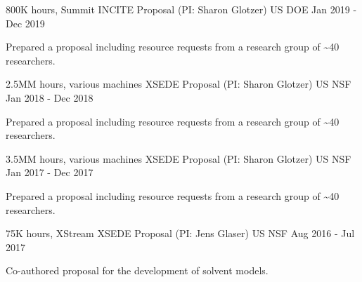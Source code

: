 \begin{cventries}
  \cventry
    {800K hours, Summit} %
    {INCITE Proposal (PI: Sharon Glotzer)} %
    {US DOE} %
    {Jan 2019 - Dec 2019} %
    {
        \begin{cvitems}
          \item Prepared a proposal including resource requests from a research group of \textasciitilde{}40 researchers.
        \end{cvitems}
    }
  \cventry
    {2.5MM hours, various machines} %
    {XSEDE Proposal (PI: Sharon Glotzer)} %
    {US NSF} %
    {Jan 2018 - Dec 2018} %
    {
        \begin{cvitems}
          \item Prepared a proposal including resource requests from a research group of \textasciitilde{}40 researchers.
        \end{cvitems}
    }
  \cventry
    {3.5MM hours, various machines} %
    {XSEDE Proposal (PI: Sharon Glotzer)} %
    {US NSF} %
    {Jan 2017 - Dec 2017} %
    {
        \begin{cvitems}
          \item Prepared a proposal including resource requests from a research group of \textasciitilde{}40 researchers.
        \end{cvitems}
    }
  \cventry
    {75K hours, XStream} %
    {XSEDE Proposal (PI: Jens Glaser)} %
    {US NSF} %
    {Aug 2016 - Jul 2017} %
    {
        \begin{cvitems}
          \item Co-authored proposal for the development of solvent models.
        \end{cvitems}
    }
\end{cventries}
